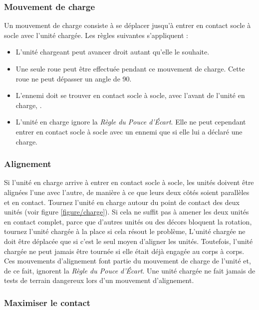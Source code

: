 \subsubsection*{Mouvement de charge}

Un mouvement de charge consiste à se déplacer jusqu'à entrer en contact socle à socle avec l'unité chargée. Les règles suivantes s'appliquent :
\begin{itemize}[label={-}]
\item L'unité chargeant peut avancer droit autant qu'elle le souhaite.
\item Une seule roue peut être effectuée pendant ce mouvement de charge. Cette roue ne peut dépasser un angle de 90{\text{\degree}}.
\item L'ennemi doit se trouver en contact socle à socle, avec l'avant de l'unité en charge, .
\item L'unité en charge ignore la \emph{Règle du Pouce d'Écart}. Elle ne peut cependant entrer en contact socle à socle avec un ennemi que si elle lui a déclaré une charge.
\end{itemize}

\subsubsection*{Alignement}

Si l'unité en charge arrive à entrer en contact socle à socle, les unités doivent être alignées l'une avec l'autre, de manière à ce que leurs deux côtés soient parallèles et en contact. Tournez l'unité en charge autour du point de contact des deux unités (voir figure \ref{figure/charge}). Si cela ne suffit pas à amener les deux unités en contact complet, parce que d'autres unités ou des décors bloquent la rotation, tournez l'unité chargée à la place si cela résout le problème,  L'unité chargée ne doit être déplacée que si c'est le seul moyen d'aligner les unités. Toutefois, l'unité chargée ne peut jamais être tournée si elle était déjà engagée au corps à corps. Ces mouvements d'alignement font partie du mouvement de charge de l'unité et, de ce fait, ignorent la \emph{Règle du Pouce d'Écart}. Une unité chargée ne fait jamais de tests de terrain dangereux lors d'un mouvement d'alignement.

\subsubsection*{Maximiser le contact}

